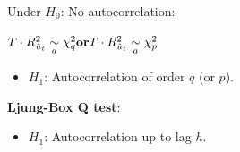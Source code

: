 \begin{f}[Detection]
\begin{itemize}[leftmargin=*]
Under \(H_{0}\): No autocorrelation:

\begin{center}
\(\hfill T \cdot R^{2}_{\hat{u}_t}\underset{a}{\sim}\chi^{2}_{q} \hfill \textbf{or} \hfill T \cdot R^{2}_{\hat{u}_t}\underset{a}{\sim}\chi^{2}_{p} \hfill\)
\end{center}

\begin{itemize}[leftmargin=*]
\item \(H_{1}\): Autocorrelation of order \(q\) (or \(p\)).
\end{itemize}

\textbf{Ljung-Box Q test}:

\begin{itemize}[leftmargin=*]
\item \(H_{1}\): Autocorrelation up to lag \(h\).
\end{itemize}

\end{itemize}



\end{f}  

